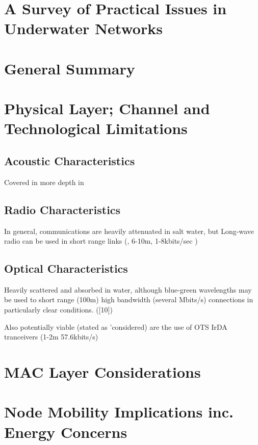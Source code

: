 \section{A Survey of Practical Issues in Underwater Networks \cite{Partan2006}}
\label{Partan2006}
\section{General Summary}

\section{Physical Layer; Channel and Technological Limitations}
\subsection{Acoustic Characteristics}
Covered in more depth in \cite{Catipovic1990}
\subsection{Radio Characteristics}
In general,  communications are heavily attenuated in salt water, but 
Long-wave radio can be used in short range links (, 6-10m, 
1-8kbits/sec )
\subsection{Optical Characteristics}
Heavily scattered and absorbed in water, although blue-green wavelengths may be
used to short range (\lt100m) high bandwidth (several Mbits/s) connections in
particularly clear conditions. \cite{Partan2006}([10])

Also potentially viable (stated as 'considered) are the use of OTS IrDA
tranceivers (1-2m \@ 57.6kbits/s)
\section{MAC Layer Considerations}
\section{Node Mobility Implications inc. Energy Concerns}


